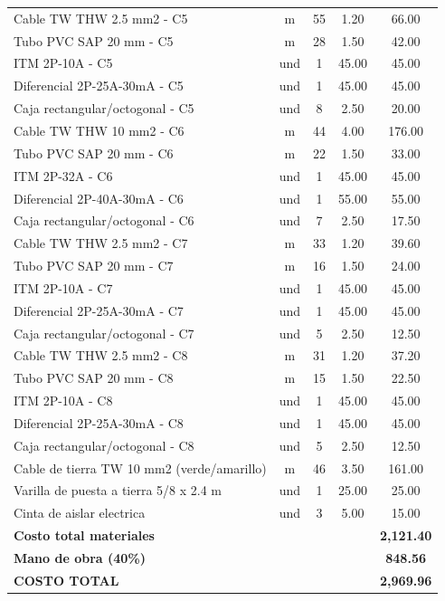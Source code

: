 \begin{table}[H]
\begin{small}
{\begin{tabular}{l c c c c}
Cable TW THW 2.5 mm2 - C5 & m & 55 & 1.20 & 66.00 \\
Tubo PVC SAP 20 mm - C5 & m & 28 & 1.50 & 42.00 \\
ITM 2P-10A - C5 & und & 1 & 45.00 & 45.00 \\
Diferencial 2P-25A-30mA - C5 & und & 1 & 45.00 & 45.00 \\
Caja rectangular/octogonal - C5 & und & 8 & 2.50 & 20.00 \\
Cable TW THW 10 mm2 - C6 & m & 44 & 4.00 & 176.00 \\
Tubo PVC SAP 20 mm - C6 & m & 22 & 1.50 & 33.00 \\
ITM 2P-32A - C6 & und & 1 & 45.00 & 45.00 \\
Diferencial 2P-40A-30mA - C6 & und & 1 & 55.00 & 55.00 \\
Caja rectangular/octogonal - C6 & und & 7 & 2.50 & 17.50 \\
Cable TW THW 2.5 mm2 - C7 & m & 33 & 1.20 & 39.60 \\
Tubo PVC SAP 20 mm - C7 & m & 16 & 1.50 & 24.00 \\
ITM 2P-10A - C7 & und & 1 & 45.00 & 45.00 \\
Diferencial 2P-25A-30mA - C7 & und & 1 & 45.00 & 45.00 \\
Caja rectangular/octogonal - C7 & und & 5 & 2.50 & 12.50 \\
Cable TW THW 2.5 mm2 - C8 & m & 31 & 1.20 & 37.20 \\
Tubo PVC SAP 20 mm - C8 & m & 15 & 1.50 & 22.50 \\
ITM 2P-10A - C8 & und & 1 & 45.00 & 45.00 \\
Diferencial 2P-25A-30mA - C8 & und & 1 & 45.00 & 45.00 \\
Caja rectangular/octogonal - C8 & und & 5 & 2.50 & 12.50 \\
Cable de tierra TW 10 mm2 (verde/amarillo) & m & 46 & 3.50 & 161.00 \\
Varilla de puesta a tierra 5/8 x 2.4 m & und & 1 & 25.00 & 25.00 \\
Cinta de aislar electrica & und & 3 & 5.00 & 15.00 \\
\midrule
\multicolumn{4}{l}{\textbf{Costo total materiales}} & \textbf{2,121.40} \\
\multicolumn{4}{l}{\textbf{Mano de obra (40\%)}} & \textbf{848.56} \\
\multicolumn{4}{l}{\textbf{COSTO TOTAL}} & \textbf{2,969.96} \\
\bottomrule
\end{tabular}%
}
\end{small}
\end{table}